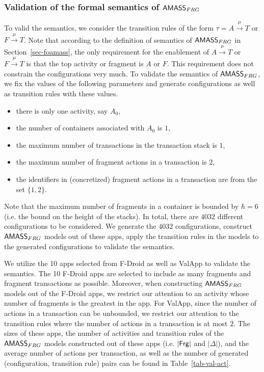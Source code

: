 %
\subsubsection{Validation of the formal semantics of $\textsf{AMASS}_{FRG}$}
%
To valid the semantics, we consider the transition rules of the form $\tau = A \xrightarrow{\mu} T$ or $F \xrightarrow{\mu} T$. 
Note that according to the definition of semantics of $\textsf{AMASS}_{FRG}$ in Section~\ref{sec-foamass}, the only requirement for the enablement of $A \xrightarrow{\mu} T$ or  $F \xrightarrow{\mu} T$ is that the top activity or fragment is $A$ or $F$. This requirement does not constrain the configurations very much. 
To validate the semantics of $\textsf{AMASS}_{FRG}$, we fix the values of the following parameters and generate configurations as well as transition rules with these values.
\begin{itemize}
\item there is only one activity, say $A_0$, 
%
\item the number of containers associated with $A_0$ is $1$, 
%
\item the maximum number of transactions in the transaction stack is $1$, 
%
\item the maximum number of fragment actions in a transaction is $2$, 
%
\item the identifiers in (concretized) fragment actions in a transaction are from the set $\{1,2\}$.
% 
\end{itemize}
Note that the maximum number of fragments in a container is bounded by $\hbar = 6$ (i.e. the bound on the height of the stacks).  
In total, there are $4032$ different configurations to be considered. 
We generate the $4032$ configurations, construct $\textsf{AMASS}_{FRG}$ models out of these apps, apply the transition rules in the models to the generated configurations to validate the semantics.

We utilize the 10 apps selected from F-Droid as well as ValApp to validate the semantics. 
The 10 F-Droid apps are selected to include as many fragments and fragment transactions as possible. Moreover, when constructing $\textsf{AMASS}_{FRG}$ models out of the F-Droid apps, we restrict our attention to an activity whose number of fragments is the greatest in the app. For ValApp, since the number of actions in a transaction can be unbounded, we restrict our attention to the transition rules where the number of actions in a transaction is at most $2$. 
The sizes of these apps, the number of activities and transition rules of the $\textsf{AMASS}_{FRG}$ models constructed out of these apps (i.e. $|{\sf Frg}|$ and $|\Delta|$), and the average number of actions per transaction, as well as the number of generated (configuration, transition rule) pairs can be found in Table~\ref{tab-val-act}. 

